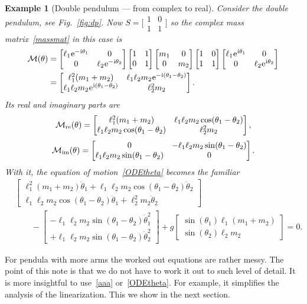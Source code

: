 \documentclass[12pt]{article}
\makeatletter
\newcommand{\cM}{\mathcal{M}}
\newcommand{\mi}{\hspace{.4pt}\mathrm{i}}
\newcommand{\e}{\hspace{.4pt}\mathrm{e}}
\theoremstyle{sfdefinition}%
\theoremstyle{sfdefinition}
\newtheorem{example}[lemma]{Example}
\def\@Endofsymbol{\decosix}
\def\Endoftheorem{\@endgadget{\@Endofsymbol}}
\newcommand{\mymatrix}[1]{\begin{bmatrix} #1 \end{bmatrix}}
\newcommand{\smat}[1]{\bigl[\begin{smallmatrix} #1 
                            \end{smallmatrix}\bigr]}
\makeatother
\begin{document}
\begin{example}[Double pendulum --- from complex to real]
  Consider the double pendulum, see Fig.~\ref{fig:dp}. Now
  $S=\smat{1&0\\1&1}$ so the complex mass matrix~\eqref{massmat} in
  this case is
  {\arraycolsep 3pt%
    \begin{align*}
    \cM(\theta) 
    & = \mymatrix{\ell_1\e^{-\mi\theta_1}&0\\0&\ell_2\e^{-\mi\theta_2}}
        \mymatrix{1&1\\ 0&1}\mymatrix{m_1&0\\0&m_2}\mymatrix{1&0\\1&1}
        \mymatrix{\ell_1\e^{\mi\theta_1}&0\\0&\ell_2\e^{\mi\theta_2}}\\
     & = \mymatrix{\ell_1^2(m_1+m_2) & \ell_1\ell_2 m_2 \e^{-\mi(\theta_1-\theta_2)}\\
        \ell_1\ell_2m_2\e^{\mi(\theta_1-\theta_2)} & \ell_2^2 m_2}. 
  \end{align*}}%
  Its real and imaginary parts are 
  \[
    \cM_{\rm re}(\theta)=
    \mymatrix{\ell_1^2(m_1+m_2) & \ell_1\ell_2 m_2 \cos(\theta_1-\theta_2)\\
      \ell_1\ell_2m_2\cos(\theta_1-\theta_2) & \ell_2^2 m_2}, 
  \]
  \[
    \cM_{\rm im}(\theta)=
    \mymatrix{0 & -\ell_1\ell_2 m_2 \sin(\theta_1-\theta_2)\\
      \ell_1\ell_2m_2\sin(\theta_1-\theta_2) & 0}. 
  \]
  With it, the equation of motion~\eqref{ODEtheta} becomes the familiar
  \begin{align*}
    &\mymatrix{
    \ell_1^2(m_1+m_2)\ddot\theta_1+\ell_1\ell_2m_2\cos(\theta_1-\theta_2)\ddot\theta_2\\
        \ell_1\ell_2m_2\cos(\theta_1-\theta_2)\ddot\theta_1+\ell_2^2m_2\ddot\theta_2} \\
     & \qquad - \mymatrix{
           -\ell_1\ell_2m_2\sin(\theta_1-\theta_2)\dot\theta_1^2\\
           +\ell_1\ell_2m_2\sin(\theta_1-\theta_2)\dot\theta_2^2}
    + g\mymatrix{\sin(\theta_1)\ell_1(m_1+m_2)\\
                   \sin(\theta_2)\ell_2m_2}=0.
  \end{align*}
  \Endoftheorem
\end{example}
For pendula with more arms the worked out equations are rather messy.
The point of this note is that we do not have to work it out to such
level of detail. It is more insightful to use~\eqref{aaa}
or~\eqref{ODEtheta}. For example, it simplifies the analysis of the
linearization. This we show in the next section.
\end{document}
